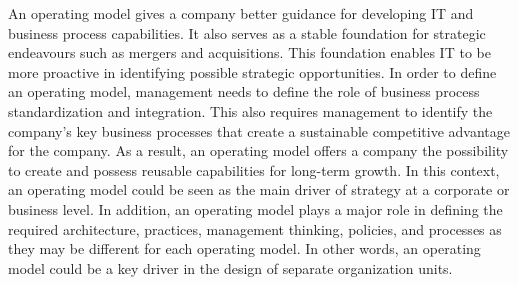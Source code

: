 An operating model gives a company better guidance for developing IT and business process capabilities.
It also serves as a stable foundation for strategic endeavours such as mergers and acquisitions.
This foundation enables IT to be more proactive in identifying possible strategic opportunities.
In order to define an operating model, management needs to define the role of business process standardization
and integration.
This also requires management to identify the company’s key business processes that create a
sustainable competitive advantage for the company.
As a result, an operating model offers a company the possibility to create and possess reusable capabilities
for long-term growth.
In this context, an operating model could be seen as the main driver of strategy at a corporate or business level.
In addition, an operating model plays a major role in defining the required architecture, practices,
management thinking, policies, and processes as they may be different for each operating model.
In other words, an operating model could be a key driver in the design of separate organization units.
